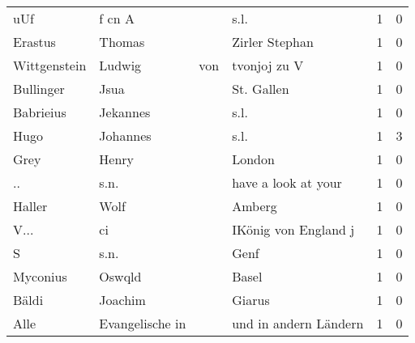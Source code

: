 \begin{tabular}{llllrr}
                      uUf &                             f cn A &             &                                        s.l. &          1 &         0 \\
                  Erastus &                             Thomas &             &                              Zirler Stephan &          1 &         0 \\
             Wittgenstein &                             Ludwig &         von &                                tvonjoj zu V &          1 &         0 \\
                Bullinger &                               Jsua &             &                                  St. Gallen &          1 &         0 \\
                Babrieius &                           Jekannes &             &                                        s.l. &          1 &         0 \\
                     Hugo &                           Johannes &             &                                        s.l. &          1 &         3 \\
                     Grey &                              Henry &             &                                      London &          1 &         0 \\
                       .. &                               s.n. &             &                         have a look at your &          1 &         0 \\
                   Haller &                               Wolf &             &                                      Amberg &          1 &         0 \\
                     V... &                                 ci &             &                        IKönig von England j &          1 &         0 \\
                        S &                               s.n. &             &                                        Genf &          1 &         0 \\
                 Myconius &                             Oswqld &             &                                       Basel &          1 &         0 \\
                    Bäldi &                            Joachim &             &                                      Giarus &          1 &         0 \\
                     Alle &                    Evangelische in &             &                       und in andern Ländern &          1 &         0 \\

\end{tabular}
